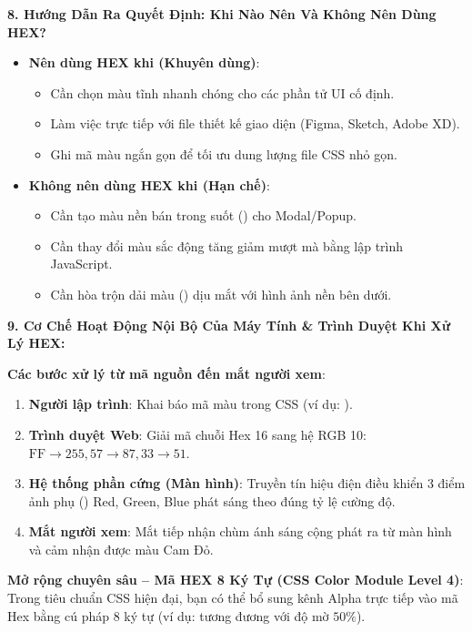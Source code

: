 \textbf{8. Hướng Dẫn Ra Quyết Định: Khi Nào Nên Và Không Nên Dùng HEX?}

\begin{conceptBox}
\begin{itemize}[leftmargin=1.5em, itemsep=3pt, parsep=0pt]
    \item \textbf{Nên dùng HEX khi (\textcolor{green!60!black}{\textbf{Khuyên dùng}})}:
    \begin{itemize}[leftmargin=1.2em, itemsep=2pt]
        \item Cần chọn màu tĩnh nhanh chóng cho các phần tử UI cố định.
        \item Làm việc trực tiếp với file thiết kế giao diện (Figma, Sketch, Adobe XD).
        \item Ghi mã màu ngắn gọn để tối ưu dung lượng file CSS nhỏ gọn.
    \end{itemize}
    \item \textbf{Không nên dùng HEX khi (\textcolor{red!80!black}{\textbf{Hạn chế}})}:
    \begin{itemize}[leftmargin=1.2em, itemsep=2pt]
        \item Cần tạo màu nền bán trong suốt () cho Modal/Popup.
        \item Cần thay đổi màu sắc động tăng giảm mượt mà bằng lập trình JavaScript.
        \item Cần hòa trộn dải màu () dịu mắt với hình ảnh nền bên dưới.
    \end{itemize}
\end{itemize}
\end{conceptBox}

\textbf{9. Cơ Chế Hoạt Động Nội Bộ Của Máy Tính \& Trình Duyệt Khi Xử Lý HEX:}

\begin{conceptBox}
\textbf{Các bước xử lý từ mã nguồn đến mắt người xem}:
\begin{enumerate}[leftmargin=1.5em, itemsep=3pt, parsep=0pt]
    \item \textbf{Người lập trình}: Khai báo mã màu trong CSS (ví dụ: ).
    \item \textbf{Trình duyệt Web}: Giải mã chuỗi Hex 16 sang hệ RGB 10: $\text{FF} \rightarrow 255, 57 \rightarrow 87, 33 \rightarrow 51$.
    \item \textbf{Hệ thống phần cứng (Màn hình)}: Truyền tín hiệu điện điều khiển 3 điểm ảnh phụ () Red, Green, Blue phát sáng theo đúng tỷ lệ cường độ.
    \item \textbf{Mắt người xem}: Mắt tiếp nhận chùm ánh sáng cộng phát ra từ màn hình và cảm nhận được màu Cam Đỏ.
\end{enumerate}

\textbf{Mở rộng chuyên sâu -- Mã HEX 8 Ký Tự (CSS Color Module Level 4)}:
Trong tiêu chuẩn CSS hiện đại, bạn có thể bổ sung kênh Alpha trực tiếp vào mã Hex bằng cú pháp 8 ký tự  (ví dụ:  tương đương với độ mờ $50\%$).
\end{conceptBox}


